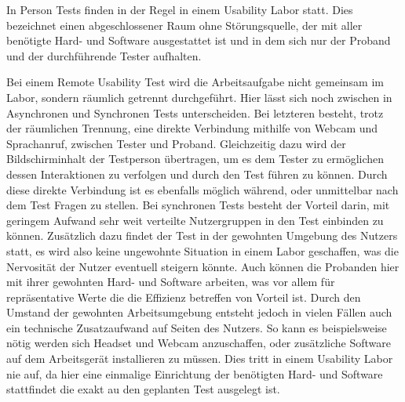 In Person Tests finden in der Regel in einem Usability Labor statt.
Dies bezeichnet einen abgeschlossener Raum ohne Störungsquelle, der mit aller benötigte Hard- und Software ausgestattet ist und in dem sich nur der Proband und der durchführende Tester aufhalten.

Bei einem Remote Usability Test wird die Arbeitsaufgabe nicht gemeinsam im Labor, sondern räumlich getrennt durchgeführt.
Hier lässt sich noch zwischen in Asynchronen und Synchronen Tests unterscheiden.
Bei letzteren besteht, trotz der räumlichen Trennung, eine direkte Verbindung mithilfe von Webcam und Sprachanruf, zwischen Tester und Proband.
Gleichzeitig dazu wird der Bildschirminhalt der Testperson übertragen, um es dem Tester zu ermöglichen dessen Interaktionen  zu verfolgen und durch den Test führen zu können.
Durch diese direkte Verbindung ist es ebenfalls möglich während, oder unmittelbar nach dem Test Fragen zu stellen.
Bei synchronen Tests besteht der Vorteil darin, mit geringem Aufwand sehr weit verteilte Nutzergruppen in den Test einbinden zu können.
Zusätzlich dazu findet der Test in der gewohnten Umgebung des Nutzers statt, es wird also keine ungewohnte Situation in einem Labor geschaffen, was die Nervosität der Nutzer eventuell steigern könnte.
Auch können die Probanden hier mit ihrer gewohnten Hard- und Software arbeiten, was vor allem für repräsentative Werte die die Effizienz betreffen von Vorteil ist.
Durch den Umstand der gewohnten Arbeitsumgebung entsteht jedoch in vielen Fällen auch ein technische Zusatzaufwand auf Seiten des Nutzers.
So kann es beispielsweise nötig werden sich Headset und Webcam anzuschaffen, oder zusätzliche Software auf dem Arbeitsgerät installieren zu müssen.
Dies tritt in einem Usability Labor nie auf, da hier eine einmalige Einrichtung der benötigten Hard- und Software stattfindet die exakt au den geplanten Test ausgelegt ist.

